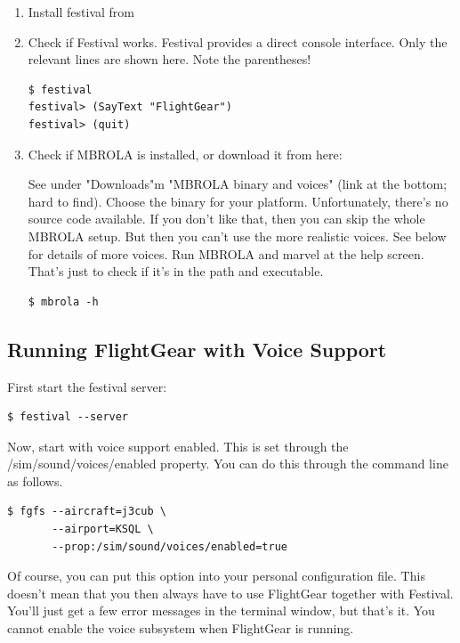 \begin{enumerate}
\item Install festival from 

\item Check if Festival works. Festival provides a direct console interface. Only the relevant lines are 
shown here. Note the parentheses!

\begin{verbatim}
$ festival
festival> (SayText "FlightGear")
festival> (quit)
\end{verbatim}

\item Check if MBROLA is installed, or download it from here: 


See under "Downloads"m "MBROLA binary and voices" 
(link at the bottom; hard to find). Choose the binary for your platform. Unfortunately, there's no 
source code available. If you don't like that, then you can skip the whole MBROLA setup. 
But then you can't use the more realistic voices. See below for details of more voices.
Run MBROLA and marvel at the help screen. That's just to check if it's in the path and executable.

\begin{verbatim}
$ mbrola -h
\end{verbatim}
\end{enumerate}

\subsection{Running FlightGear with Voice Support}

First start the festival server:

\begin{verbatim}
$ festival --server
\end{verbatim}

Now, start \FlightGear{} with voice support enabled. This is set through the
/sim/sound/voices/enabled property. You can do this through the command line as follows.

\begin{verbatim}
$ fgfs --aircraft=j3cub \
       --airport=KSQL \
       --prop:/sim/sound/voices/enabled=true
\end{verbatim}

Of course, you can put this option into your personal configuration file. 
This doesn't mean that you then always have to use FlightGear together with Festival. 
You'll just get a few error messages in the terminal window, but that's it. You cannot enable
the voice subsystem when FlightGear is running.

